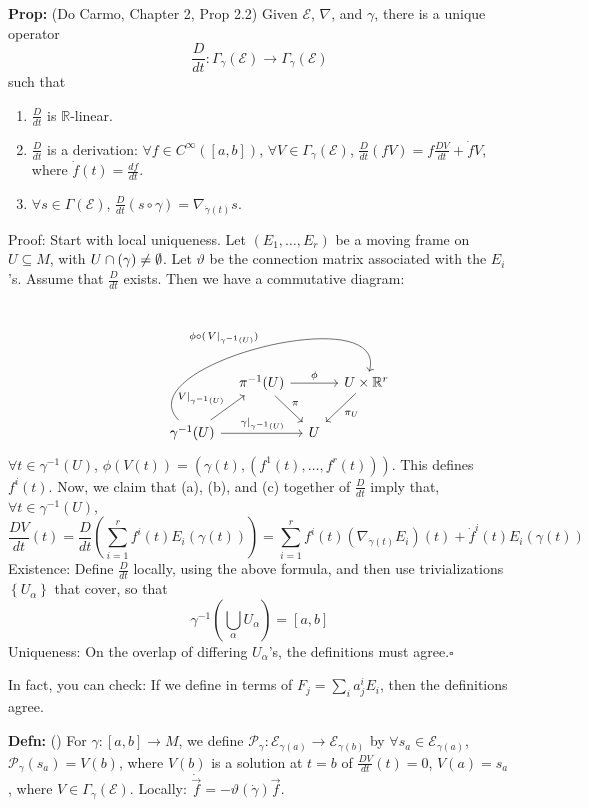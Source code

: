 \documentclass[10pt,letterpaper]{article}
\newcommand{\n}{\hfill\break}
\newcommand{\nn}{\vspace{0.5\baselineskip}\n}
\newcommand{\up}{\vspace{-\baselineskip}}
\newcommand{\hangblock}[2]{\par\noindent\settowidth{\hangindent}{\textbf{#1: }}\textbf{#1: }\nolinebreak#2}
\newcommand{\defn}[1]{\hangblock{Defn}{#1}}
\newcommand{\prop}[1]{\hangblock{Prop}{#1}}
\newcommand{\proven}{\;$\square$\n}
\newcommand{\set}[1]{\left\{#1\right\}}
\newcommand{\reals}{\mathbb{R}}
\newcommand{\R}{\reals}
\newcommand{\inv}{^{-1}}
\newcommand{\of}{\circ}
\newcommand{\restr}[2]{\left.#1\right|_{#2}}
\let\Im\relax
\DeclareMathOperator{\Im}{Im}
\newcommand{\paren}[1]{\left(#1\right)}
\let\u\relax
\newcommand{\u}[1]{\underline{#1}}
\begin{document}
\newpage
\prop{
	(Do Carmo, Chapter 2, Prop 2.2) Given $\mathcal{E}$, $\nabla$, and $\gamma$, there is a unique operator
	\[
		\frac{D}{dt}:\Gamma_{\gamma}(\mathcal{E})\to\Gamma_{\gamma}(\mathcal{E})
	\]
	such that
	\begin{enumerate}[leftmargin=4\parindent, topsep=0pt, itemsep=0pt, label=(\alph*)]
		\item $\frac{D}{dt}$ is $\R$-linear.
		\item $\frac{D}{dt}$ is a derivation: $\forall{}f\in{}C^{\infty}([a,b])$, $\forall{}V\in\Gamma_{\gamma}(\mathcal{E})$, $\frac{D}{dt}(fV)=f\frac{DV}{dt}+\dot{f}V$, where $\dot{f}(t)=\frac{df}{dt}$.
		\item $\forall{}s\in\Gamma(\mathcal{E})$, $\frac{D}{dt}(s\of\gamma)=\nabla_{\dot\gamma(t)}s$.
	\end{enumerate}\up\nn
	Proof: Start with local uniqueness. Let $(E_{1},\ldots,E_{r})$ be a moving frame on $U\subseteq{}M$, with $U\cap\Im(\gamma)\ne\emptyset$. Let $\vartheta$ be the connection matrix associated with the $E_{i}$'s. Assume that $\frac{D}{dt}$ exists. Then we have a commutative diagram:
	\up\up
	\[
		\begin{tikzcd}[ampersand replacement=\&]
			\&[-15pt] \pi\inv(U) \arrow[rr, "\phi"] \arrow[dr, "\pi"] \&[-15pt] \&[-15pt] U\times\R^{r} \arrow[dl, "\pi_{U}"]\\
			\gamma\inv(U) \arrow[ur, "{\restr{V}{\gamma\inv(U)}}"] \arrow[rr, "{\restr{\gamma}{\gamma\inv(U)}}"] \arrow[urrr, bend left=120, "\phi\of(\restr{V}{\gamma\inv(U)})"] \& \& U
		\end{tikzcd}
	\]
	$\forall{}t\in\gamma\inv(U)$, $\phi(V(t))=(\gamma(t),(f^{1}(t),\ldots,f^{r}(t)))$. This defines $f^{i}(t)$. Now, we claim that (a), (b), and (c) together of $\frac{D}{dt}$ imply that, $\forall{}t\in\gamma\inv(U)$,
	\[
		\frac{DV}{dt}(t)=\frac{D}{dt}\paren{\sum_{i=1}^{r}f^{i}(t)E_{i}(\gamma(t))}=\sum_{i=1}^{r}f^{i}(t)(\nabla_{\dot\gamma(t)}E_{i})(t)+\dot{f}^{i}(t)E_{i}(\gamma(t))
	\]
	Existence: Define $\frac{D}{dt}$ locally, using the above formula, and then use trivializations $\set{U_{\alpha}}$ that cover, so that
	\[
		\gamma\inv\paren{\bigcup_{\alpha}U_{\alpha}}=[a,b]
	\]
	Uniqueness: On the overlap of differing $U_{\alpha}$'s, the definitions must agree.\proven
}

\par\noindent
In fact, you can check: If we define in terms of $F_{j}=\sum_{i}a_{j}^{i}E_{i}$, then the definitions agree.\n

\defn{
	(\u{Parallel Transport}) For $\gamma:[a,b]\to{}M$, we define $\mathcal{P}_{\gamma}:\mathcal{E}_{\gamma(a)}\to\mathcal{E}_{\gamma(b)}$ by $\forall{}s_{a}\in\mathcal{E}_{\gamma(a)}$, $\mathcal{P}_{\gamma}(s_{a})=V(b)$, where $V(b)$ is a solution at $t=b$ of $\frac{DV}{dt}(t)=0$, $V(a)=s_{a}$, where $V\in\Gamma_{\gamma}(\mathcal{E})$. Locally: $\dot{\vec{f}}=-\vartheta(\dot\gamma)\vec{f}$.\n
}
\end{document}

